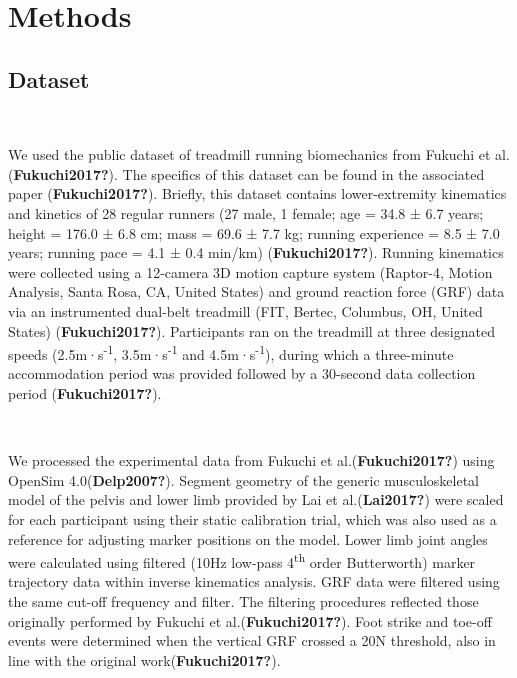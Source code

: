 \documentclass[]{elsarticle} %
\begin{document}
\hypertarget{methods}{%
\section{Methods}\label{methods}}

\hypertarget{dataset}{%
\subsection{Dataset}\label{dataset}}

~

We used the public dataset of treadmill running biomechanics from
Fukuchi et al.(\textbf{Fukuchi2017?}). The specifics of this dataset can
be found in the associated paper (\textbf{Fukuchi2017?}). Briefly, this
dataset contains lower-extremity kinematics and kinetics of 28 regular
runners (27 male, 1 female; age = 34.8 ± 6.7 years; height = 176.0 ± 6.8
cm; mass = 69.6 ± 7.7 kg; running experience = 8.5 ± 7.0 years; running
pace = 4.1 ± 0.4 min/km) (\textbf{Fukuchi2017?}). Running kinematics
were collected using a 12-camera 3D motion capture system (Raptor-4,
Motion Analysis, Santa Rosa, CA, United States) and ground reaction
force (GRF) data via an instrumented dual-belt treadmill (FIT, Bertec,
Columbus, OH, United States) (\textbf{Fukuchi2017?}). Participants ran
on the treadmill at three designated speeds (2.5m·s\textsuperscript{-1},
3.5m·s\textsuperscript{-1} and 4.5m·s\textsuperscript{-1}), during which
a three-minute accommodation period was provided followed by a 30-second
data collection period (\textbf{Fukuchi2017?}).

~

We processed the experimental data from Fukuchi et
al.(\textbf{Fukuchi2017?}) using OpenSim 4.0(\textbf{Delp2007?}).
Segment geometry of the generic musculoskeletal model of the pelvis and
lower limb provided by Lai et al.(\textbf{Lai2017?}) were scaled for
each participant using their static calibration trial, which was also
used as a reference for adjusting marker positions on the model. Lower
limb joint angles were calculated using filtered (10Hz low-pass
4\textsuperscript{th} order Butterworth) marker trajectory data within
inverse kinematics analysis. GRF data were filtered using the same
cut-off frequency and filter. The filtering procedures reflected those
originally performed by Fukuchi et al.(\textbf{Fukuchi2017?}). Foot
strike and toe-off events were determined when the vertical GRF crossed
a 20N threshold, also in line with the original
work(\textbf{Fukuchi2017?}).
\end{document}
